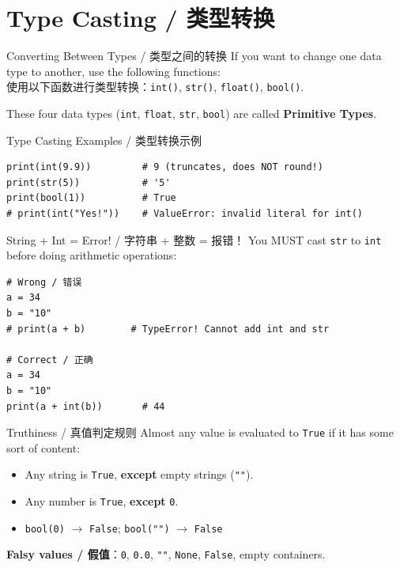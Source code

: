 \documentclass[11pt,a4paper]{report}
\let\oldtexttt\texttt
\renewcommand{\texttt}[1]{\textcolor{mainblue}{\oldtexttt{#1}}}
\begin{document}
\section{Type Casting / 类型转换}

\begin{concept}{Converting Between Types / 类型之间的转换}
    If you want to change one data type to another, use the following functions: \\
    使用以下函数进行类型转换：\texttt{int()}, \texttt{str()}, \texttt{float()}, \texttt{bool()}.

    These four data types (\texttt{int}, \texttt{float}, \texttt{str}, \texttt{bool}) are called \textbf{Primitive Types}.
\end{concept}

\begin{examplebox}{Type Casting Examples / 类型转换示例}
\begin{lstlisting}
print(int(9.9))         # 9 (truncates, does NOT round!)
print(str(5))           # '5'
print(bool(1))          # True
# print(int("Yes!"))    # ValueError: invalid literal for int()
\end{lstlisting}
\end{examplebox}

\begin{warning}{String + Int = Error! / 字符串 + 整数 = 报错！}
    You MUST cast \texttt{str} to \texttt{int} before doing arithmetic operations:
\begin{lstlisting}
# Wrong / 错误
a = 34
b = "10"
# print(a + b)        # TypeError! Cannot add int and str

# Correct / 正确
a = 34
b = "10"
print(a + int(b))       # 44
\end{lstlisting}
\end{warning}

\begin{concept}{Truthiness / 真值判定规则}
    Almost any value is evaluated to \texttt{True} if it has some sort of content:
    \begin{itemize}[itemsep=0.3em]
        \item Any string is \texttt{True}, \textbf{except} empty strings (\texttt{""}).
        \item Any number is \texttt{True}, \textbf{except} \texttt{0}.
        \item \texttt{bool(0)} $\rightarrow$ \texttt{False}; \texttt{bool("")} $\rightarrow$ \texttt{False}
    \end{itemize}
    \textbf{Falsy values / 假值}：\texttt{0}, \texttt{0.0}, \texttt{""}, \texttt{None}, \texttt{False}, empty containers.
\end{concept}
\end{document}
